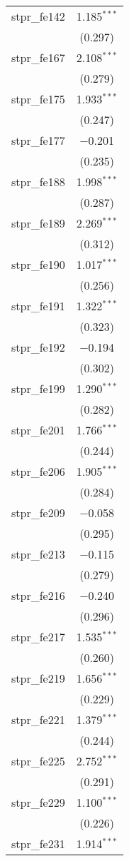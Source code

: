 \begin{table}[!htbp]
\begin{tabular}{@{\extracolsep{5pt}}lc}
  stpr\_fe142 & 1.185$^{***}$ \\ 
  & (0.297) \\ 
  stpr\_fe167 & 2.108$^{***}$ \\ 
  & (0.279) \\ 
  stpr\_fe175 & 1.933$^{***}$ \\ 
  & (0.247) \\ 
  stpr\_fe177 & $-$0.201 \\ 
  & (0.235) \\ 
  stpr\_fe188 & 1.998$^{***}$ \\ 
  & (0.287) \\ 
  stpr\_fe189 & 2.269$^{***}$ \\ 
  & (0.312) \\ 
  stpr\_fe190 & 1.017$^{***}$ \\ 
  & (0.256) \\ 
  stpr\_fe191 & 1.322$^{***}$ \\ 
  & (0.323) \\ 
  stpr\_fe192 & $-$0.194 \\ 
  & (0.302) \\ 
  stpr\_fe199 & 1.290$^{***}$ \\ 
  & (0.282) \\ 
  stpr\_fe201 & 1.766$^{***}$ \\ 
  & (0.244) \\ 
  stpr\_fe206 & 1.905$^{***}$ \\ 
  & (0.284) \\ 
  stpr\_fe209 & $-$0.058 \\ 
  & (0.295) \\ 
  stpr\_fe213 & $-$0.115 \\ 
  & (0.279) \\ 
  stpr\_fe216 & $-$0.240 \\ 
  & (0.296) \\ 
  stpr\_fe217 & 1.535$^{***}$ \\ 
  & (0.260) \\ 
  stpr\_fe219 & 1.656$^{***}$ \\ 
  & (0.229) \\ 
  stpr\_fe221 & 1.379$^{***}$ \\ 
  & (0.244) \\ 
  stpr\_fe225 & 2.752$^{***}$ \\ 
  & (0.291) \\ 
  stpr\_fe229 & 1.100$^{***}$ \\ 
  & (0.226) \\ 
  stpr\_fe231 & 1.914$^{***}$ \\ 

\end{tabular}
\end{table}
